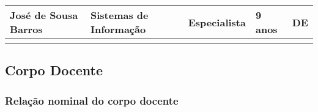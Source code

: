 \begin{table}[h]
\begin{tabular}{lllll}
\multicolumn{1}{|l|}{José de Sousa Barros}      & \multicolumn{1}{l|}{Sistemas de Informação} & \multicolumn{1}{l|}{Especialista}       & \multicolumn{1}{l|}{9 anos}                                                                       & \multicolumn{1}{l|}{DE}                                                                    \\ \hline
\multicolumn{5}{l}{\cellcolor[HTML]{9B9B9B}{\color[HTML]{9B9B9B} }}                                                                                                                                                                                                                                                                     
\end{tabular}
\label{tab:nde}
\end{table}

\subsection{Corpo Docente}

\subsubsection{Rela\c{c}\~ao nominal do corpo docente}

